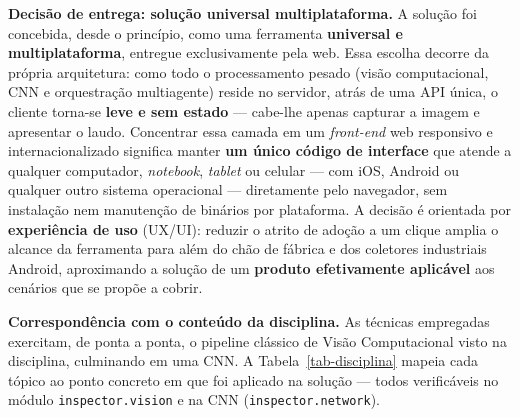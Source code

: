 \documentclass[
	article,			%
	11pt,				%
	oneside,			%
	a4paper,			%
	english,			%
	brazilian,			%
	sumario=tradicional
	]{abntex2}
\begin{document}
\noindent\textbf{Decisão de entrega: solução universal multiplataforma.} A solução
foi concebida, desde o princípio, como uma ferramenta \textbf{universal e
multiplataforma}, entregue exclusivamente pela web. Essa escolha decorre da própria
arquitetura: como todo o processamento pesado (visão computacional, CNN e
orquestração multiagente) reside no servidor, atrás de uma API única, o cliente
torna-se \textbf{leve e sem estado} --- cabe-lhe apenas capturar a imagem e
apresentar o laudo. Concentrar essa camada em um \textit{front-end} web responsivo
e internacionalizado significa manter \textbf{um único código de interface} que
atende a qualquer computador, \textit{notebook}, \textit{tablet} ou celular --- com
iOS, Android ou qualquer outro sistema operacional --- diretamente pelo navegador,
sem instalação nem manutenção de binários por plataforma. A decisão é orientada por
\textbf{experiência de uso} (UX/UI): reduzir o atrito de adoção a um clique amplia
o alcance da ferramenta para além do chão de fábrica e dos coletores industriais
Android, aproximando a solução de um \textbf{produto efetivamente aplicável} aos
cenários que se propõe a cobrir.

\noindent\textbf{Correspondência com o conteúdo da disciplina.} As técnicas
empregadas exercitam, de ponta a ponta, o pipeline clássico de Visão Computacional
visto na disciplina, culminando em uma CNN. A Tabela~\ref{tab-disciplina} mapeia
cada tópico ao ponto concreto em que foi aplicado na solução --- todos verificáveis
no módulo \texttt{inspector.vision} e na CNN (\texttt{inspector.network}).
\end{document}
